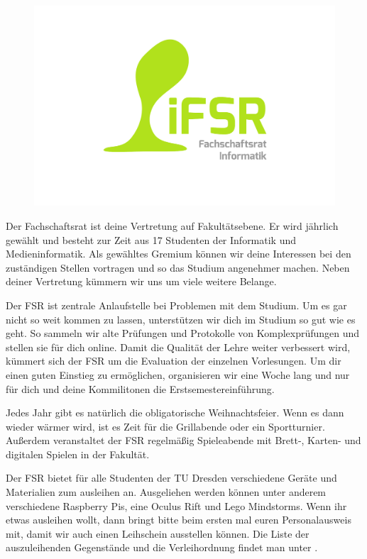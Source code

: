 

\begin{figure}\ \\[-1cm]
\flushright\includegraphics[width=\linewidth]{img/fsr_logo}
\end{figure}

Der Fachschaftsrat ist deine Vertretung auf Fakultätsebene.
Er wird jährlich gewählt und besteht zur Zeit aus 17 Studenten der Informatik und Medieninformatik.
Als gewähltes Gremium können wir deine Interessen bei den zuständigen Stellen vortragen und so das Studium angenehmer machen.
Neben deiner Vertretung kümmern wir uns um viele weitere Belange.

Der FSR ist zentrale Anlaufstelle bei Problemen mit dem Studium.
Um es gar nicht so weit kommen zu lassen, unterstützen wir dich im Studium so gut wie es geht.
So sammeln wir alte Prüfungen und Protokolle von Komplexprüfungen und stellen sie für dich online.
Damit die Qualität der Lehre weiter verbessert wird, kümmert sich der FSR um die Evaluation der einzelnen Vorlesungen.
Um dir einen guten Einstieg zu ermöglichen, organisieren wir eine Woche lang und nur für dich und deine Kommilitonen die Erstsemestereinführung.

Jedes Jahr gibt es natürlich die obligatorische Weihnachtsfeier.
Wenn es dann wieder wärmer wird, ist es Zeit für die Grillabende oder ein Sportturnier. \\
Außerdem veranstaltet der FSR regelmäßig Spieleabende mit Brett-, Karten- und digitalen Spielen in der Fakultät.

Der FSR bietet für alle Studenten der TU Dresden verschiedene Geräte und Materialien zum ausleihen an. Ausgeliehen werden können unter anderem verschiedene Raspberry Pis, eine Oculus Rift und Lego Mindstorms.
 Wenn ihr etwas ausleihen wollt, dann bringt bitte beim ersten mal euren Personalausweis mit, damit wir auch einen Leihschein ausstellen können. 
Die Liste der auszuleihenden Gegenstände und die Verleihordnung findet man unter .

